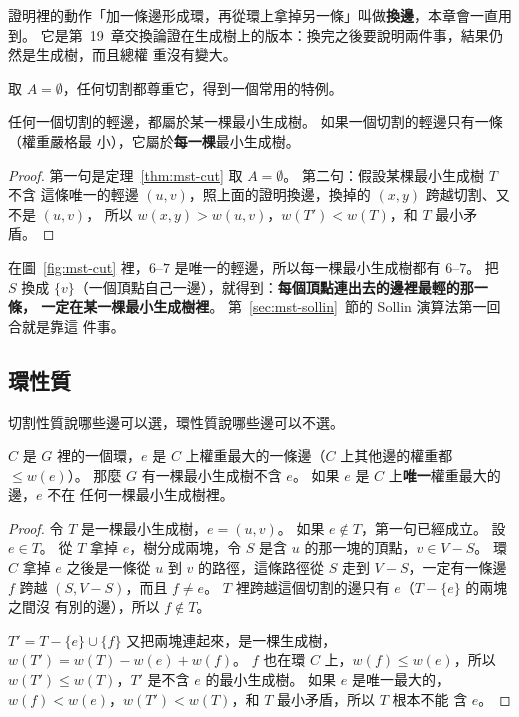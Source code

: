證明裡的動作「加一條邊形成環，再從環上拿掉另一條」叫做\textbf{換邊}，本章會一直用到。
它是第~19~章交換論證在生成樹上的版本：換完之後要說明兩件事，結果仍然是生成樹，而且總權
重沒有變大。

取 $A = \emptyset$，任何切割都尊重它，得到一個常用的特例。

\begin{corollary}
\label{cor:mst-cut-strict}
任何一個切割的輕邊，都屬於某一棵最小生成樹。 如果一個切割的輕邊只有一條（權重嚴格最
小），它屬於\textbf{每一棵}最小生成樹。
\end{corollary}

\begin{proof}
第一句是定理~\ref{thm:mst-cut} 取 $A = \emptyset$。 第二句：假設某棵最小生成樹 $T$ 不含
這條唯一的輕邊 $(u, v)$，照上面的證明換邊，換掉的 $(x, y)$ 跨越切割、又不是 $(u, v)$，
所以 $w(x, y) > w(u, v)$，$w(T') < w(T)$，和 $T$ 最小矛盾。
\end{proof}

在圖~\ref{fig:mst-cut} 裡，$6$--$7$ 是唯一的輕邊，所以每一棵最小生成樹都有 $6$--$7$。 把
$S$ 換成 $\{v\}$（一個頂點自己一邊），就得到：\textbf{每個頂點連出去的邊裡最輕的那一條，
一定在某一棵最小生成樹裡}。 第~\ref{sec:mst-sollin}~節的 Sollin 演算法第一回合就是靠這
件事。

\subsection{環性質}

切割性質說哪些邊可以選，環性質說哪些邊可以不選。

\begin{theorem}[環性質]
\label{thm:mst-cycle}
$C$ 是 $G$ 裡的一個環，$e$ 是 $C$ 上權重最大的一條邊（$C$ 上其他邊的權重都 $\le w(e)$）。
那麼 $G$ 有一棵最小生成樹不含 $e$。 如果 $e$ 是 $C$ 上\textbf{唯一}權重最大的邊，$e$ 不在
任何一棵最小生成樹裡。
\end{theorem}

\begin{proof}
令 $T$ 是一棵最小生成樹，$e = (u, v)$。 如果 $e \notin T$，第一句已經成立。 設 $e \in
T$。 從 $T$ 拿掉 $e$，樹分成兩塊，令 $S$ 是含 $u$ 的那一塊的頂點，$v \in V - S$。 環 $C$
拿掉 $e$ 之後是一條從 $u$ 到 $v$ 的路徑，這條路徑從 $S$ 走到 $V - S$，一定有一條邊 $f$ 跨越
$(S, V - S)$，而且 $f \ne e$。 $T$ 裡跨越這個切割的邊只有 $e$（$T - \{e\}$ 的兩塊之間沒
有別的邊），所以 $f \notin T$。

$T' = T - \{e\} \cup \{f\}$ 又把兩塊連起來，是一棵生成樹，$w(T') = w(T) - w(e) + w(f)$。
$f$ 也在環 $C$ 上，$w(f) \le w(e)$，所以 $w(T') \le w(T)$，$T'$ 是不含 $e$ 的最小生成樹。
如果 $e$ 是唯一最大的，$w(f) < w(e)$，$w(T') < w(T)$，和 $T$ 最小矛盾，所以 $T$ 根本不能
含 $e$。
\end{proof}

